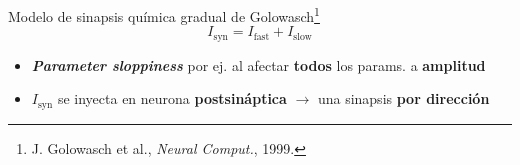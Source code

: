 \documentclass[10pt, aspectratio=169]{beamer}
\begin{document}
\begin{frame}{Modelo de sinapsis química gradual de Golowasch\footnote{J. Golowasch et al., \textit{Neural Comput.}, 1999.}}
    \begin{equation*}
        \boxed{I_{\mathrm{syn}} = I_{\mathrm{fast}} + I_{\mathrm{slow}}}
    \end{equation*}
    \vspace{0.8em}
    \begin{itemize}
        \item \textbf{\textit{Parameter sloppiness}} por ej. al afectar \textbf{todos} los params. a \textbf{amplitud}
              \vspace{1.5em}
        \item $I_{\mathrm{syn}}$ se inyecta en neurona \textbf{postsináptica} $\to$ una sinapsis \textbf{por dirección}
    \end{itemize}
\end{frame}
\end{document}
